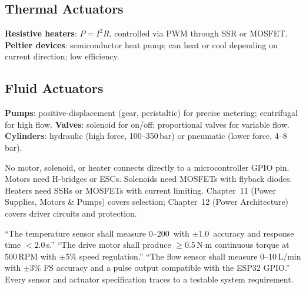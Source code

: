 \subsection{Thermal Actuators}
\textbf{Resistive heaters}: $P = I^2R$, controlled via PWM through SSR or MOSFET. \textbf{Peltier devices}: semiconductor heat pump; can heat or cool depending on current direction; low efficiency.

\subsection{Fluid Actuators}
\textbf{Pumps}: positive-displacement (gear, peristaltic) for precise metering; centrifugal for high flow. \textbf{Valves}: solenoid for on/off; proportional valves for variable flow. \textbf{Cylinders}: hydraulic (high force, 100--350\,bar) or pneumatic (lower force, 4--8\,bar).

\begin{warningbox}
No motor, solenoid, or heater connects directly to a microcontroller GPIO pin. Motors need H-bridges or ESCs. Solenoids need MOSFETs with flyback diodes. Heaters need SSRs or MOSFETs with current limiting. Chapter~11 (Power Supplies, Motors \& Pumps) covers selection; Chapter~12 (Power Architecture) covers driver circuits and protection.
\end{warningbox}

\begin{keyconceptbox}
``The temperature sensor shall measure 0--200\,\degC{} with $\pm$1.0\,\degC{} accuracy and response time $<$2.0\,s.'' ``The drive motor shall produce $\geq$0.5\,N$\cdot$m continuous torque at 500\,RPM with $\pm$5\% speed regulation.'' ``The flow sensor shall measure 0--10\,L/min with $\pm$3\% FS accuracy and a pulse output compatible with the ESP32 GPIO.'' Every sensor and actuator specification traces to a testable system requirement.
\end{keyconceptbox}

